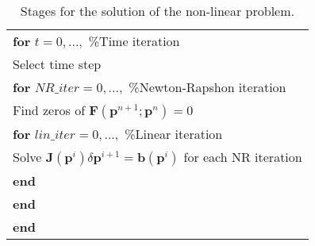\documentclass[12pt]{article}
\numberwithin{equation}{section}
\begin{document}
\begin{table}[!h]\centering
\begin{minipage}{.7\textwidth}
\begin{tabular}{ |l| } 
\hline
\hspace{0.5cm}\textbf{for} $t=0,...,$    \hspace{37mm}    \%Time iteration \\
\hspace{1cm} Select time step\\
\hspace{1cm}\textbf{for} $NR\_iter=0,...,$    \hspace{20mm}    \%Newton-Rapshon iteration\\
 \hspace{1.5cm} Find zeros of $\mathbf{F}(\mathbf{p}^{n+1};\mathbf{p}^n)=0$\\
\hspace{1.5cm}\textbf{for} $lin\_iter=0,...,$    \hspace{21mm}    \%Linear iteration \\
\hspace{2cm}Solve $\mathbf{J}(\mathbf{p}^i)\delta \mathbf{p}^{i+1}=\mathbf{b}(\mathbf{p}^i)$ for each NR iteration\\
\hspace{1.5cm}\textbf{end}\\
\hspace{1cm}\textbf{end}\\
\hspace{0.5cm}\textbf{end}\\
\hline
\end{tabular}
\caption{Stages for the solution of the non-linear problem.}
\label{table:solstages}
\end{minipage}
\end{table}
 
\newpage
\end{document}
